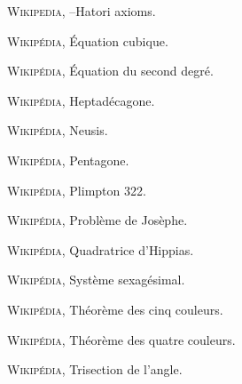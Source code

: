 \begin{thebibliography}{99}

\textsc{Wikipedia}, –{Hatori} axioms\fg.





\textsc{Wikipédia}, \og Équation cubique\fg.

\textsc{Wikipédia}, \og Équation du second degré\fg.


 \textsc{Wikipédia}, \og Heptadécagone\fg.


\textsc{Wikipédia}, \og Neusis\fg.

  
\textsc{Wikipédia}, \og Pentagone\fg.

\textsc{Wikipédia}, \og Plimpton 322\fg.

\textsc{Wikipédia}, \og Problème de {J}osèphe\fg.


\textsc{Wikipédia}, \og Quadratrice d'{Hippias}\fg.

\textsc{Wikipédia}, \og Système sexagésimal\fg.




\textsc{Wikipédia}, \og Théorème des cinq couleurs\fg.


\textsc{Wikipédia}, \og Théorème des quatre couleurs\fg.



    


\textsc{Wikipédia}, \og Trisection de l'angle\fg.



  



  

  

  











  

\end{thebibliography}